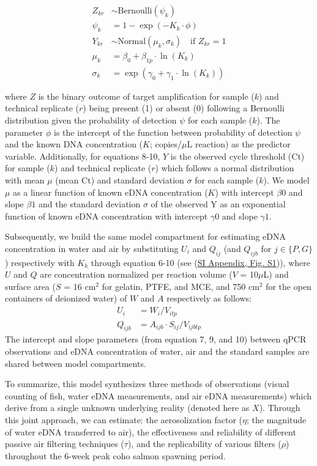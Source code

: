 \documentclass{article}
\begin{document}
\begin{align}
    Z_{kr} &\sim \mathrm{Bernoulli} \left(\psi_{k}\right)  \\
    \psi_{k} &= 1 - \exp(-K_{k} \cdot \phi) \\
    Y_{kr} &\sim \mathrm{Normal} (\mu_{k}, \sigma_{k}) \quad \text{if } Z_{kr} = 1 \\
    \mu_{k} &= \beta_0 + \beta_{1p} \cdot \ln (K_{k}) \\
    \sigma_{k} &= \exp(\gamma_0 + \gamma_1 \cdot \ln (K_{k}))
\end{align}

where $Z$ is the binary outcome of target amplification for sample ($k$) and technical replicate ($r$) being present (1) or absent (0) following a Bernoulli distribution given the probability of detection $\psi$ for each sample ($k$). The parameter $\phi$ is the intercept of the function between probability of detection $\psi$ and the known DNA concentration ($K$; copies/$\mu$L reaction) as the predictor variable. Additionally, for equations 8-10, $Y$ is the observed cycle threshold (Ct) for sample ($k$) and technical replicate ($r$) which follows a normal distribution with mean $\mu$ (mean Ct) and standard deviation $\sigma$ for each sample ($k$). We model $\mu$ as a linear function of known eDNA concentration ($K$) with intercept $\beta0$ and slope $\beta1$ and the standard deviation $\sigma$ of the observed Y as an exponential function of known eDNA concentration with intercept $\gamma0$ and slope $\gamma1$.

Subsequently, we build the same model compartment for estimating eDNA concentration in water and air by substituting $U_i$ and $Q_{ij}$ (and $Q_{ijb}$ for $j \in \{P,G\}$) respectively with $K_k$ through equation 6-10 (see (\href{SI_Appendix.pdf}{SI Appendix, Fig. S1})), where $U$ and $Q$ are concentration normalized per reaction volume ($V$ = 10$\mu$L) and surface area ($S$ = 16 cm$^2$ for gelatin, PTFE, and MCE, and 750 cm$^2$ for the open containers of deionized water) of $W$ and $A$ respectively as follows:
\begin{align}
    U_i & = W_i / V_{itp}\\
    Q_{ijb} & = A_{ijb} \cdot S_{ij} / V_{ijbtp}
\end{align}
The intercept and slope parameters (from equation 7, 9, and 10) between qPCR observations and eDNA concentration of water, air and the standard samples are shared between model compartments.


To summarize, this model synthesizes three methods of observations (visual counting of fish, water eDNA measurements, and air eDNA measurements) which derive from a single unknown underlying reality (denoted here as $X$). Through this joint approach, we can estimate: the aerosolization factor ($\eta$; the magnitude of water eDNA transferred to air), the effectiveness and reliability of different passive air filtering techniques ($\tau$), and the replicability of various filters ($\rho$) throughout the 6-week peak coho salmon spawning period.
\end{document}
